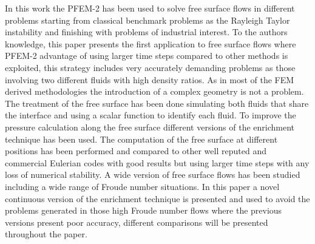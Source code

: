 In this work the PFEM-2 has been used to solve free surface flows in different problems starting from classical benchmark problems as the Rayleigh Taylor instability and finishing with problems of industrial interest. To the authors knowledge, this paper presents the first application to free surface flows where PFEM-2 advantage of using larger time steps compared to other methods is exploited, this strategy includes very accurately demanding problems as those involving two different fluids with high density ratios.
As in most of the FEM derived methodologies the introduction of a complex geometry is not a problem. The treatment of the free surface has been done simulating both fluids that share the interface and using a scalar function to identify each fluid. To improve the pressure calculation along the free surface different versions of the enrichment technique \cite{Coppola05} has been used. The computation of the free surface at different positions has been performed and compared to other well reputed and commercial Eulerian codes with good results but using larger time steps with any loss of numerical stability. A wide version of free surface flows has been studied including a wide range of Froude number situations. In this paper a novel continuous version of the enrichment technique is presented and used to avoid the problems generated in those high Froude number flows where the previous versions present poor accuracy, different comparisons will be presented throughout the paper.  